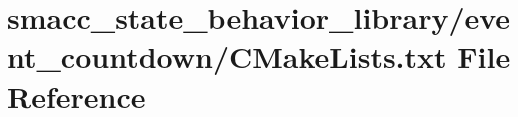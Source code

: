 \hypertarget{state__behavior__library_2event__countdown_2CMakeLists_8txt}{}\section{smacc\+\_\+state\+\_\+behavior\+\_\+library/event\+\_\+countdown/\+C\+Make\+Lists.txt File Reference}
\label{state__behavior__library_2event__countdown_2CMakeLists_8txt}
